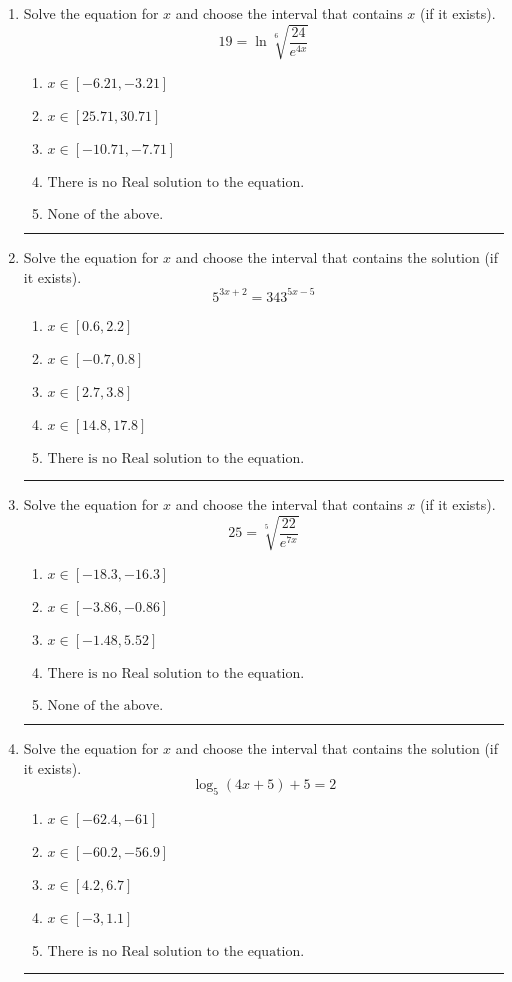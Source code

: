 \documentclass[14pt]{extbook}
\newcommand{\litem}[1]{\item#1\hspace*{-1cm}\rule{\textwidth}{0.4pt}}
\begin{document}
\begin{enumerate}
{\begin{enumerate}[label=\Alph*.]
\end{enumerate} }
\litem{
 Solve the equation for $x$ and choose the interval that contains $x$ (if it exists).\[  19 = \ln{\sqrt[6]{\frac{24}{e^{4x}}}} \]\begin{enumerate}[label=\Alph*.]
\item \( x \in [-6.21, -3.21] \)
\item \( x \in [25.71, 30.71] \)
\item \( x \in [-10.71, -7.71] \)
\item \( \text{There is no Real solution to the equation.} \)
\item \( \text{None of the above.} \)

\end{enumerate} }
\litem{
Solve the equation for $x$ and choose the interval that contains the solution (if it exists).\[ 5^{3x+2} = 343^{5x-5} \]\begin{enumerate}[label=\Alph*.]
\item \( x \in [0.6, 2.2] \)
\item \( x \in [-0.7, 0.8] \)
\item \( x \in [2.7, 3.8] \)
\item \( x \in [14.8, 17.8] \)
\item \( \text{There is no Real solution to the equation.} \)

\end{enumerate} }
\litem{
 Solve the equation for $x$ and choose the interval that contains $x$ (if it exists).\[  25 = \sqrt[5]{\frac{22}{e^{7x}}} \]\begin{enumerate}[label=\Alph*.]
\item \( x \in [-18.3, -16.3] \)
\item \( x \in [-3.86, -0.86] \)
\item \( x \in [-1.48, 5.52] \)
\item \( \text{There is no Real solution to the equation.} \)
\item \( \text{None of the above.} \)

\end{enumerate} }
\litem{
Solve the equation for $x$ and choose the interval that contains the solution (if it exists).\[ \log_{5}{(4x+5)}+5 = 2 \]\begin{enumerate}[label=\Alph*.]
\item \( x \in [-62.4, -61] \)
\item \( x \in [-60.2, -56.9] \)
\item \( x \in [4.2, 6.7] \)
\item \( x \in [-3, 1.1] \)
\item \( \text{There is no Real solution to the equation.} \)


\end{enumerate}}
\end{enumerate}
\end{document}
